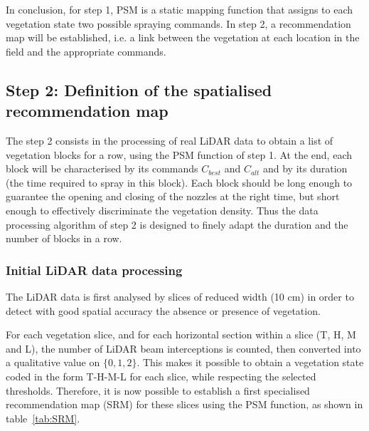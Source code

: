 \documentclass[preprint,3p,times,twocolumn]{elsarticle}
\begin{document}
In conclusion, for step 1, PSM is a static mapping function that assigns to each vegetation state two possible spraying commands. In step 2, a recommendation map will be established, i.e. a link between the vegetation at each location in the field and the appropriate commands.

\subsection{Step 2: Definition of the spatialised recommendation map}
\label{sec:step2}
The step 2 consists in the processing of real LiDAR data to obtain a list of vegetation blocks for a row, using the PSM function of step 1. At the end, each block will be characterised by its commands $ C_{best} $ and $ C_{alt} $ and by its duration (the time required to spray in this block). Each block should be long enough to guarantee the opening and closing of the nozzles at the right time, but short enough to effectively discriminate the vegetation density. Thus the data processing algorithm of step 2 is designed to finely adapt the duration and the number of blocks in a row.

\subsubsection{Initial LiDAR data processing}

The LiDAR data is first analysed by slices of reduced width (10 cm) in order to detect with good spatial accuracy the absence or presence of vegetation. 

For each vegetation slice, and for each horizontal section within a slice (T, H, M and L), the number of LiDAR beam interceptions is counted, then converted into a qualitative value on $\{0, 1, 2\}$. This makes it possible to obtain a vegetation state coded in the form T-H-M-L for each slice, while respecting the selected thresholds. Therefore, it is now possible to establish a first specialised recommendation map (SRM) for these slices using the PSM function, as shown in table~\ref{tab:SRM}.
\end{document}
